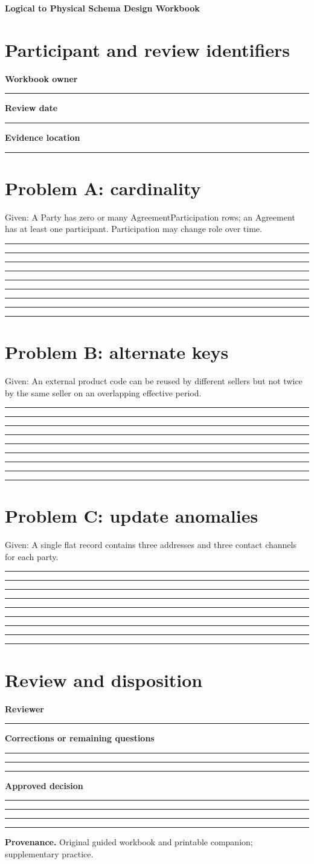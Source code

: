 \documentclass[11pt,letterpaper]{article}
\newcommand{\ResponseLine}{\par\vspace{1.05em}\noindent\rule{\linewidth}{0.4pt}\par}
\newcommand{\ResponseArea}{\ResponseLine\ResponseLine\ResponseLine}
\begin{document}
\begin{center}
{\LARGE\bfseries\color{navy} Logical to Physical Schema Design Workbook}\par
\vspace{0.25em}{\large Printable Blank | response fields left empty}\par
{}
\end{center}
\vspace{0.8em}
\section{Participant and review identifiers}
\textbf{Workbook owner}\ResponseLine\textbf{Review date}\ResponseLine\textbf{Evidence location}\ResponseLine
\section{Problem A: cardinality}
Given: A Party has zero or many AgreementParticipation rows; an Agreement has at least one participant. Participation may change role over time.


\ResponseArea\ResponseArea\ResponseArea
\section{Problem B: alternate keys}
Given: An external product code can be reused by different sellers but not twice by the same seller on an overlapping effective period.


\ResponseArea\ResponseArea\ResponseArea
\section{Problem C: update anomalies}
Given: A single flat record contains three addresses and three contact channels for each party.


\ResponseArea\ResponseArea\ResponseArea
\section{Review and disposition}
\textbf{Reviewer}\ResponseLine\textbf{Corrections or remaining questions}\ResponseArea\textbf{Approved decision}\ResponseArea
\vfill
\hrule
{\footnotesize\textbf{Provenance.} Original guided workbook and printable companion; supplementary practice.}
\end{document}
